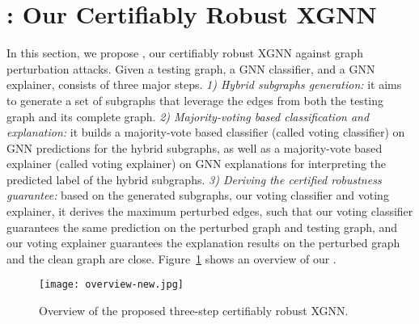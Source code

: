 \section{{\name}: Our Certifiably Robust XGNN}
\label{sec:xgnncert}

\vspace{-2mm}
In this section, we propose  {\name}, our certifiably robust XGNN against graph perturbation attacks.   
Given a testing graph, a GNN classifier, and a GNN explainer, {\name} consists of three major steps. 
\emph{1) Hybrid subgraphs generation:} it aims to generate a set of subgraphs that leverage  the edges from both the testing graph and its  complete graph. 
\emph{2) Majority-voting based classification and explanation:} it builds a majority-vote based classifier (called voting classifier) on GNN predictions for the hybrid subgraphs,
as well as a majority-vote based explainer (called voting explainer) on GNN explanations for interpreting the predicted label of the hybrid subgraphs. 
\emph{3) Deriving the certified robustness guarantee:} based on the generated subgraphs, our voting classifier and voting explainer, it derives the maximum perturbed edges, such that our voting classifier guarantees the same prediction on the perturbed graph and testing graph, and our voting explainer guarantees the explanation results on the perturbed graph and the clean graph are close.
 Figure~\ref{fig:overview} shows an overview of our {\name}. 

\begin{figure}[t]
\vspace{-4mm}
    \centering
    \captionsetup[subfloat]{labelsep=none, format=plain, labelformat=empty}

    \texttt{[image: overview-new.jpg]}
    \vspace{-4mm}
    \caption{Overview of the proposed three-step certifiably robust XGNN.
    }
    \label{fig:overview}
   \vspace{-2mm}
\end{figure}

